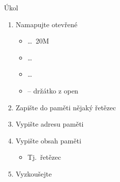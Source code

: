 \begin{frame}{Úkol}

  \begin{enumerate}
    \item Namapujte otevřené 
    \begin{itemize}
      \item {} \dots\ 20M
      \item {} \dots\ 
      \item {} \dots\ 
      \item {} -- držátko  z open
    \end{itemize}

    \item Zapište do paměti nějaký řetězec
    \item Vypište adresu paměti
    \item Vypište obsah paměti
    \begin{itemize}
      \item Tj.\ řetězec
    \end{itemize}
    \item Vyzkoušejte
  \end{enumerate}

\end{frame}

